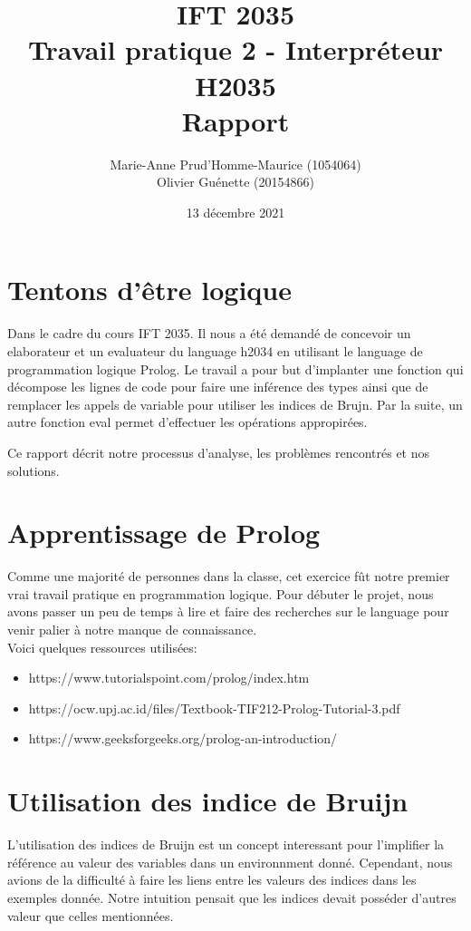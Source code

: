 \documentclass[12pt, letterpaper]{article}
\title{IFT 2035 \\ Travail pratique 2 - Interpréteur H2035 \\ Rapport }
\author{ Marie-Anne Prud'Homme-Maurice (1054064) 
\\ Olivier Guénette (20154866)}
\date{13 décembre 2021}
\begin{document}
\maketitle

\section*{Tentons d'être logique} 

Dans le cadre du cours IFT 2035. Il nous a été demandé de concevoir un 
elaborateur et un evaluateur du language h2034 en utilisant le language 
de programmation logique Prolog. Le travail a pour but d'implanter une 
fonction qui décompose les lignes de code pour faire une inférence des types
ainsi que de remplacer les appels de variable pour utiliser les indices de 
Brujn. Par la suite, un autre fonction eval permet d'effectuer les opérations 
appropirées.

Ce rapport décrit notre processus d'analyse, les problèmes rencontrés et nos
solutions.

\section*{Apprentissage de Prolog}

Comme une majorité de personnes dans la classe, cet exercice fût notre premier
vrai travail pratique en programmation logique. Pour débuter le projet, nous 
avons passer un peu de temps à lire et faire des recherches sur le language 
pour venir palier à notre manque de connaissance.\\

Voici quelques ressources utilisées: 
\begin{itemize}
    \item https://www.tutorialspoint.com/prolog/index.htm
    \item https://ocw.upj.ac.id/files/Textbook-TIF212-Prolog-Tutorial-3.pdf
    \item https://www.geeksforgeeks.org/prolog-an-introduction/
\end{itemize}

\section*{Utilisation des indice de Bruijn}

L'utilisation des indices de Bruijn est un concept interessant pour l'implifier
la référence au valeur des variables dans un environnment donné. Cependant, 
nous avions de la difficulté à faire les liens entre les valeurs des indices 
dans les exemples donnée. Notre intuition pensait que les indices devait 
posséder d'autres valeur que celles mentionnées.
\end{document}

